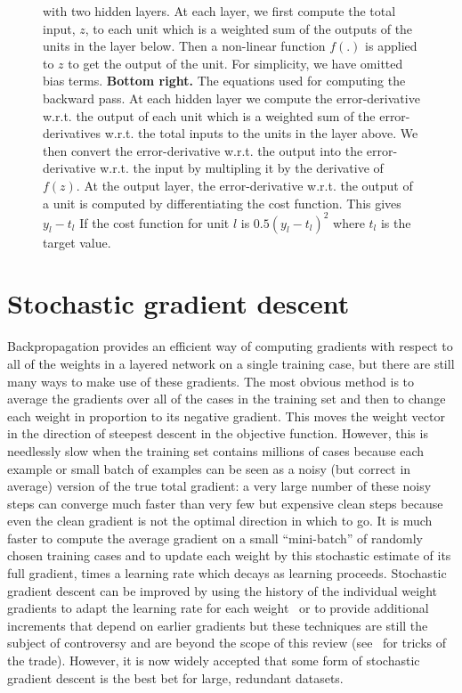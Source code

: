 \documentclass[10pts]{article}
\begin{document}
\begin{figure}[htp]
{\begin{minipage}{\textwidth}
{with two hidden layers. At each layer, we first compute the total input,
$z$, to each unit which is a weighted sum of the outputs of the units in
the layer below. Then a non-linear function $f(.)$ is applied to $z$ to get
the output of the unit.  For simplicity, we have omitted bias terms. \newline
{\bf Bottom right.} The equations used for computing the backward pass. At each hidden
layer we compute the error-derivative w.r.t. the output of each unit which
is a weighted sum of the error-derivatives w.r.t. the total inputs to the
units in the layer above. We then convert the error-derivative w.r.t. the
output into the error-derivative w.r.t. the input by multipling it by the
derivative of $f(z)$.  At the output layer, the error-derivative w.r.t. the
output of a unit is computed by differentiating the cost function. This
gives $y_l-t_l$ If the cost function for unit $l$ is $0.5(y_l-t_l)^2$ where
$t_l$ is the target value.
}
\label{fig:backprop-box}
\end{minipage}
}
\end{figure}


\section{Stochastic gradient descent}

Backpropagation provides an efficient way of computing gradients with respect to all of
the weights in a layered network on a single training case, but there are
still many ways to make use of these gradients. The most obvious method is
to average the gradients over all of the cases in the training set and then
to change each weight in proportion to its negative gradient. This
moves the weight vector in the direction of steepest descent in the
objective function. 
However, this is needlessly slow when the 
training set contains millions of cases because each example or small batch of
examples can be seen as a noisy (but correct in average) version of the true total gradient: a very large
number of these noisy steps can converge much faster than very few but expensive clean steps because even
the clean gradient is not the optimal direction in which to go.
%
It is much faster to compute the average gradient
on a small ``mini-batch'' of randomly chosen training cases and to update
each weight by this stochastic estimate of its full gradient, times a
learning rate which decays as learning proceeds. Stochastic gradient
descent can be improved by using the history of the individual weight
gradients to adapt the learning rate for each weight~\citep{bottou-bousquet-2008-small}
or to provide additional increments that depend on earlier gradients 
but these techniques are still the subject of controversy and are beyond
the scope of this review (see~\citet{Montavon2012} for tricks of the trade). 
However, it is now widely accepted that some
form of stochastic gradient descent is the best bet for large, redundant
datasets.
\end{document}
